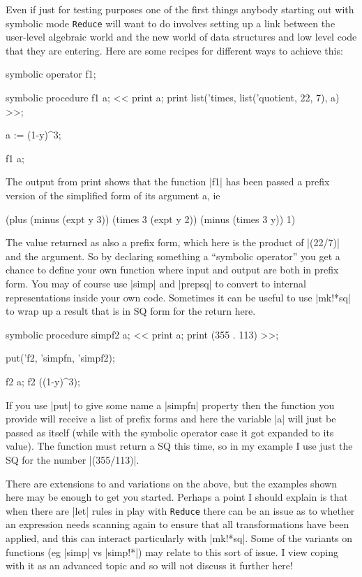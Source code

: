 \documentclass[12pt,twoside,openright]{memoir}
\newcommand{\reduce}{\texttt{Reduce}\xspace}
\begin{document}
Even if just for testing purposes one of the first
things anybody starting out with symbolic mode \reduce will want to do involves
setting up a link between the user-level algebraic world and the new world of
data structures and low level code that they are entering. Here are some
recipes for different ways to achieve this:
\begin{rlispverb}
  symbolic operator f1;

  symbolic procedure f1 a;
    << print a;
       print list('times, list('quotient, 22, 7), a) >>;

  a := (1-y)^3;

  f1 a;
\end{rlispverb}
The output from print shows that the function |f1| has been passed
a prefix version of the simplified form of its argument a, ie
\begin{rlispverb}
   (plus (minus (expt y 3)) (times 3 (expt y 2))
      (minus (times 3 y)) 1)
\end{rlispverb}
The value returned as also a prefix form, which here is the product of
|(22/7)| and the argument. So by declaring something a ``symbolic
operator'' you get a chance to define your own function where input and output
are both in prefix form. You may of course use |simp| and |prepsq| to convert to
internal representations inside your own code. Sometimes it can be useful to
use |mk!*sq| to wrap up a result that is in SQ form for the return here.
\begin{rlispverb}
  symbolic procedure simpf2 a;
    << print a;
       print (355 . 113) >>;

  put('f2, 'simpfn, 'simpf2);

  f2 a;
  f2 ((1-y)^3);
\end{rlispverb}
If you use |put| to give some name a |simpfn| property then the
function you provide will receive a list of prefix forms and here the
variable |a| will just be passed as itself (while with the symbolic operator
case it got expanded to its value). The function must return a SQ this
time, so in my example I use just the SQ for the number |(355/113)|.

There are extensions to and variations on the above, but the examples shown
here may be enough to get you started. Perhaps a point I should explain is that
when there are |let| rules in play with \reduce there can be an issue as to
whether an expression needs scanning again to ensure that all transformations
have been applied, and this can interact particularly with |mk!*sq|. Some
of the variants on functions (eg |simp| vs |simp!*|) may relate to this
sort of issue. I view coping with it as an advanced topic and so will not
discuss it further here!
\end{document}
